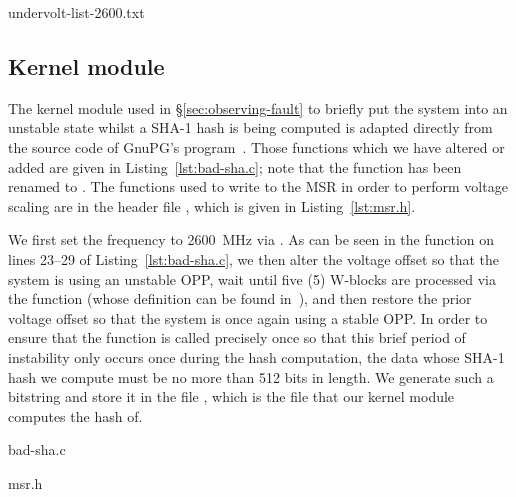 
    {undervolt-list-2600.txt}

\subsection{Kernel module}
\label{sec:bad-sha}

The kernel module used in §\ref{sec:observing-fault} to briefly put the
system into an unstable state whilst a SHA-1 hash is being computed is adapted
directly from the source code of GnuPG's  program~\cite{gnupgSHA}.
Those functions which we have altered or added are given in Listing~\ref{lst:bad-sha.c};
note that the  function has been renamed to .
The functions used to write to the MSR in order to perform voltage scaling are
in the header file , which is given in Listing~\ref{lst:msr.h}.

We first set the frequency to 2600~MHz via . As can be seen in
the  function on lines 23–29 of Listing~\ref{lst:bad-sha.c},
we then alter the voltage offset so that the system is using an unstable OPP,
wait until five (5) W-blocks are processed via the  function (whose
definition can be found in~\cite{gnupgSHA}), and then restore the prior voltage
offset so that the system is once again using a stable OPP. In order to ensure
that the  function is called precisely once so that this brief
period of instability only occurs once during the hash computation, the data
whose SHA-1 hash we compute must be no more than 512 bits in length. We
generate such a bitstring and store it in the file ,
which is the file that our kernel module computes the hash of.


    {bad-sha.c}


    {msr.h}
